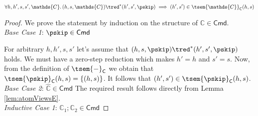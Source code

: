 \begin{lem}
	\label{lem:atomViewsC}
	\begin{gather*}
		\forall h, h', s, s', \mathds{C} \ldotp
		(h, s, \mathds{C}) \tred^* (h', s', \pskip)
		\implies
		(h', s') \in \tsem{\mathds{C}}_\mathsf{C}(h, s)
	\end{gather*}
	{\parindent0pt
	\begin{proof}
	We prove the statement by induction on the structure of $\mathds{C} \in \mathsf{Cmd}$. \\
	\indline
	\textit{Base Case 1}: $\pskip \in \mathsf{Cmd}$
	
	For arbitrary $h, h', s, s'$ let's assume that $(h, s, \pskip) \tred^* (h', s', \pskip)$ holds. We must have a zero-step reduction which makes $h' = h$ and $s' = s$. Now, from the definition of $\tsem{-}_\mathsf{C}$ we obtain that $\tsem{\pskip}_\mathsf{C}(h, s) = \{(h,s)\}$. It follows that $(h', s') \in \tsem{\pskip}_\mathsf{C}(h, s)$. \\
	\indline
	\textit{Base Case 2}: $\hat{\mathds{C}} \in \mathsf{Cmd}$
	The required result follows directly from Lemma \ref{lem:atomViewsE}. \\
	\indline
	\textit{Inductive Case 1}: $\mathds{C}_1 ; \mathds{C}_2 \in \mathsf{Cmd}$
	

\end{proof}}
\end{lem}
